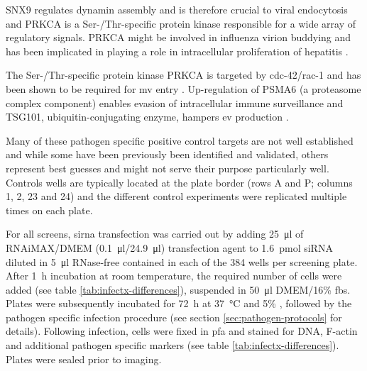 \begin{description}[leftmargin=0.5cm]
\item[Adenovirus\slash rhinovirus:] SNX9 regulates dynamin assembly and is therefore crucial to viral endocytosis and PRKCA is a Ser-\slash Thr-specific protein kinase responsible for a wide array of regulatory signals. PRKCA might be involved in influenza virion buddying and has been implicated in playing a role in intracellular proliferation of hepatitis \citep{Kanehisa2000}.
\item[Vaccinia virus:] The Ser-\slash Thr-specific protein kinase PRKCA is targeted by \gls{cdc-42}\slash \gls{rac-1} and has been shown to be required for \gls{mv} entry \citep{Mercer2008}. Up-regulation of PSMA6 (a proteasome complex component) enables evasion of intracellular immune surveillance \citep{Zhou2014} and TSG101, ubiquitin-conjugating enzyme, hampers \gls{ev} production \citep{Honeychurch2007}. 
\end{description}

Many of these pathogen specific positive control targets are not well established and while some have been previously been identified and validated, others represent best guesses and might not serve their purpose particularly well. Controls wells are typically located at the plate border (rows A and P; columns 1, 2, 23 and 24) and the different control experiments were replicated multiple times on each plate.

For all screens, \gls{sirna} transfection was carried out by adding \SI{25}{\micro\litre} of RNAi\-MAX\slash DMEM (\SI{0.1}{\micro\litre}\slash \SI{24.9}{\micro\litre}) transfection agent to \SI{1.6}{\pico\mol} siRNA diluted in \SI{5}{\micro\litre} RNase-free  contained in each of the 384 wells per screening plate. After \SI{1}{\hour} incubation at room temperature, the required number of cells were added (see table \ref{tab:infectx-differences}), suspended in \SI{50}{\micro\litre} DMEM\slash 16\% \gls{fbs}. Plates were subsequently incubated for \SI{72}{\hour} at \SI{37}{\celsius} and 5\% , followed by the pathogen specific infection procedure (see section \ref{sec:pathogen-protocols} for details). Following infection, cells were fixed in \gls{pfa} and stained for DNA, F-actin and additional pathogen specific markers (see table \ref{tab:infectx-differences}). Plates were sealed prior to imaging.

